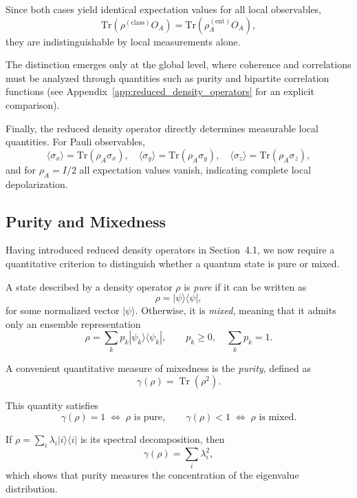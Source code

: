 \documentclass[a4paper]{article}
\begin{document}
Since both cases yield identical expectation values for all local observables,
\[
\mathrm{Tr}(\rho^{(\mathrm{class})} O_A)
=
\mathrm{Tr}(\rho_A^{(\mathrm{ent})} O_A),
\]
they are indistinguishable by local measurements alone.

The distinction emerges only at the global level, where coherence and correlations must be analyzed through quantities such as purity and bipartite correlation functions (see Appendix~\ref{app:reduced_density_operators} for an explicit comparison).

\medskip

Finally, the reduced density operator directly determines measurable local quantities. For Pauli observables,
\[
\langle \sigma_x \rangle = \mathrm{Tr}(\rho_A \sigma_x), \quad
\langle \sigma_y \rangle = \mathrm{Tr}(\rho_A \sigma_y), \quad
\langle \sigma_z \rangle = \mathrm{Tr}(\rho_A \sigma_z),
\]
and for \( \rho_A = I/2 \) all expectation values vanish, indicating complete local depolarization.


\subsection{Purity and Mixedness}

Having introduced reduced density operators in Section~4.1, we now require a quantitative criterion to distinguish whether a quantum state is pure or mixed.

A state described by a density operator \( \rho \) is \emph{pure} if it can be written as
\[
\rho = |\psi\rangle \langle \psi|,
\]
for some normalized vector \( |\psi\rangle \). Otherwise, it is \emph{mixed}, meaning that it admits only an ensemble representation
\[
\rho = \sum_k p_k |\psi_k\rangle \langle \psi_k|, 
\qquad p_k \ge 0, \quad \sum_k p_k = 1.
\]

\medskip

A convenient quantitative measure of mixedness is the \emph{purity}, defined as
\[
\gamma(\rho) = \operatorname{Tr}(\rho^2).
\]

This quantity satisfies
\[
\gamma(\rho) = 1 \;\Longleftrightarrow\; \rho \text{ is pure}, 
\qquad
\gamma(\rho) < 1 \;\Longleftrightarrow\; \rho \text{ is mixed}.
\]

If \( \rho = \sum_i \lambda_i |i\rangle \langle i| \) is its spectral decomposition, then
\[
\gamma(\rho) = \sum_i \lambda_i^2,
\]
which shows that purity measures the concentration of the eigenvalue distribution.
\end{document}
